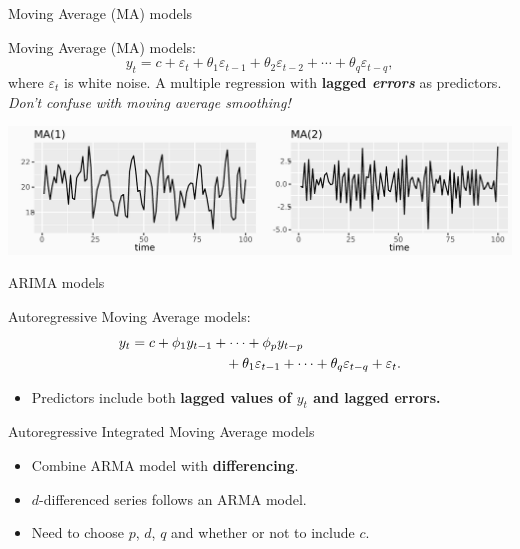 \documentclass[
  14pt,
  ignorenonframetext,
  aspectratio=169,
]{beamer}
\providecommand{\tightlist}{%
  \setlength{\itemsep}{0pt}\setlength{\parskip}{0pt}}\usepackage{longtable,booktabs,array}
\begin{document}
\begin{frame}{Moving Average (MA) models}
\protect\hypertarget{moving-average-ma-models}{}
\begin{block}{Moving Average (MA) models:}\vspace*{-0.3cm}
$$
  y_{t} = c + \varepsilon_t + \theta_{1}\varepsilon_{t - 1} + \theta_{2}\varepsilon_{t - 2} + \cdots + \theta_{q}\varepsilon_{t - q},
$$
where $\varepsilon_t$ is white noise.
A multiple regression with \textbf{lagged \emph{errors}} as predictors. \emph{Don't confuse with moving average smoothing!}
\end{block}

\includegraphics{04_arima_files/figure-beamer/maq-1.pdf}
\end{frame}

\begin{frame}{ARIMA models}
\protect\hypertarget{arima-models-2}{}
\begin{block}{Autoregressive Moving Average models:}\vspace*{-0.7cm}
\begin{align*}
  y_{t} &= c + \phi_{1}y_{t - 1} + \cdots + \phi_{p}y_{t - p} \\
        & \hspace*{2.4cm}\text{} + \theta_{1}\varepsilon_{t - 1} + \cdots + \theta_{q}\varepsilon_{t - q} + \varepsilon_{t}.
\end{align*}
\end{block}\pause

\begin{itemize}
\tightlist
\item
  Predictors include both \textbf{lagged values of \(y_t\) and lagged
  errors.} \pause
\end{itemize}

\begin{block}{Autoregressive Integrated Moving Average models}
\protect\hypertarget{autoregressive-integrated-moving-average-models}{}
\begin{itemize}
\tightlist
\item
  Combine ARMA model with \textbf{differencing}.
\item
  \(d\)-differenced series follows an ARMA model.
\item
  Need to choose \(p\), \(d\), \(q\) and whether or not to include
  \(c\).
\end{itemize}
\end{block}
\end{frame}
\end{document}
